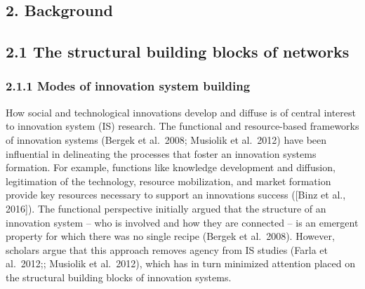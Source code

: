 \documentclass[twoside,12pt,final]{ucthesis-CA2012}
\begin{document}
\begin{ucmainmatter}
\hypertarget{background-2}{%
\section{2. Background}\label{background-2}}

\hypertarget{the-structural-building-blocks-of-networks}{%
\subsection{2.1 The structural building blocks of networks}\label{the-structural-building-blocks-of-networks}}

\hypertarget{modes-of-innovation-system-building}{%
\subsubsection{2.1.1 Modes of innovation system building}\label{modes-of-innovation-system-building}}

How social and technological innovations develop and diffuse is of
central interest to innovation system (IS) research. The functional and
resource-based frameworks of innovation systems (Bergek et al.~2008;
Musiolik et al.~2012) have been influential in delineating the processes
that foster an innovation system\textquotesingle s formation. For example, functions
like knowledge development and diffusion, legitimation of the
technology, resource mobilization, and market formation provide key
resources necessary to support an innovation\textquotesingle s success ({[}Binz et al.,
2016{]}). The functional
perspective initially argued that the structure of an innovation system
-- who is involved and how they are connected -- is an emergent property
for which there was no single recipe (Bergek et al.~2008). However,
scholars argue that this approach removes agency from IS studies (Farla
et al.~2012;; Musiolik et al.~2012), which has in turn minimized
attention placed on the structural building blocks of innovation
systems.


\end{ucmainmatter}
\end{document}
